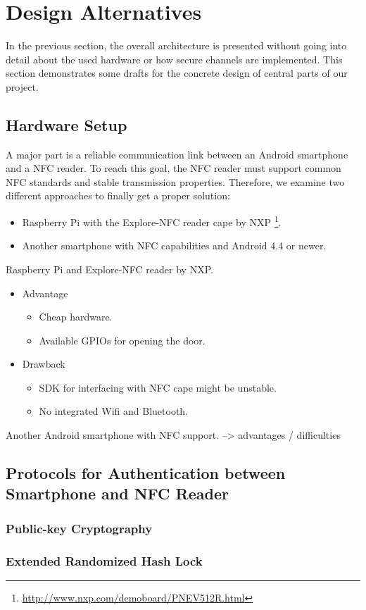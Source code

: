 \section{Design Alternatives}\label{sec:alt}
In the previous section, the overall architecture is presented without going into detail about the used hardware or how secure channels are implemented.
This section demonstrates some drafts for the concrete design of central parts of our project. 

\subsection{Hardware Setup}
A major part is a reliable communication link between an Android smartphone and a NFC reader.
To reach this goal, the NFC reader must support common NFC standards and stable transmission properties.
Therefore, we examine two different approaches to finally get a proper solution:
\begin{itemize}
	\item Raspberry Pi with the Explore-NFC reader cape by NXP \footnote{\url{http://www.nxp.com/demoboard/PNEV512R.html}}.
	\item Another smartphone with NFC capabilities and Android 4.4 or newer.
\end{itemize}

Raspberry Pi and Explore-NFC reader by NXP.
\begin{itemize}
	\item Advantage
	\begin{itemize}
		\item Cheap hardware.
		\item Available GPIOs for opening the door.
	\end{itemize}
	\item Drawback
	\begin{itemize}
		\item SDK for interfacing with NFC cape might be unstable.
		\item No integrated Wifi and Bluetooth.
	\end{itemize}
\end{itemize}

Another Android smartphone with NFC support.
--> advantages / difficulties

\subsection{Protocols for Authentication between Smartphone and NFC Reader}

\subsubsection{Public-key Cryptography}

\subsubsection{Extended Randomized Hash Lock}
